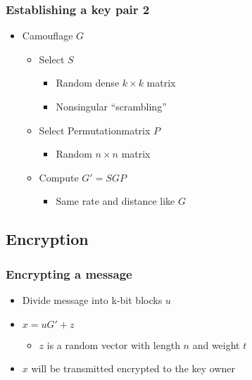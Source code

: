 	
		\begin{frame}
			\frametitle{Establishing a key pair 2}
			\begin{itemize}
				\item Camouflage $G$
				\begin{itemize}
					\item Select $S$
					\begin{itemize}
						\item Random dense $k \times k$ matrix 
						\item Nonsingular ``scrambling''
					\end{itemize}
					\item Select Permutationmatrix $P$
					\begin{itemize}
						\item Random $n \times n$ matrix 
					\end{itemize}		
					\item Compute $G' = SGP$
					\begin{itemize}
						\item Same rate and distance like $G$
					\end{itemize}	

	
				\end{itemize}
			\end{itemize}
		\end{frame}
	
	\subsection{Encryption}
		\begin{frame}
			\frametitle{Encrypting a message}
			\begin{itemize}
				\item Divide message into k-bit blocks $u$
				\item  $x = uG' + z$
				\begin{itemize}
					\item $z$ is a random vector with length $n$ and weight $t$
				\end{itemize}
				\item $x$ will be transmitted encrypted to the key owner
			\end{itemize}
			
		\end{frame}
	
